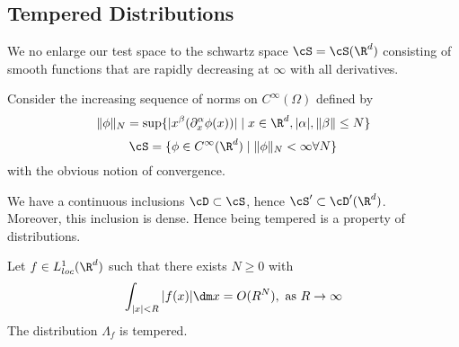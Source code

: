 	\subsection{Tempered Distributions}
	We no enlarge our test space to the schwartz space $\cS = \cS(\R^d)$ consisting of smooth functions that are rapidly decreasing at $\infty$ with all derivatives.
	\begin{definition}
		Consider the increasing sequence of norms on $C^\infty(\Omega)$ defined by
		\[
		\|\phi\|_N = \sup \{ | x^\beta (\partial_x^\alpha \phi(x)) | \mid x \in \R^d , |\alpha|,\|\beta\|\le N\}
		\]
		\[
		\cS = \{\phi \in C^\infty(\R^d) \mid \|\phi\|_N < \infty \forall N\}
		\]
		with the obvious notion of convergence.
	\end{definition}
	\begin{lemma}
		We have a continuous inclusions $\cD \subset \cS$, hence $\cS' \subset \cD'(\R^d)$. \\
		Moreover, this inclusion is dense. Hence being tempered is a property of distributions. %
	\end{lemma}
	\begin{lemma}{\label{lemma:slowlyInc}}
		Let $f \in L^1_{loc}(\R^d)$ such that there exists $N \ge 0$ with
		\[
		\int_{|x| < R} |f(x)| \dm x = O(R^N) , \text{ as } R \to \infty
		\]
		The distribution $\Lambda_f$ is tempered.
	\end{lemma}

